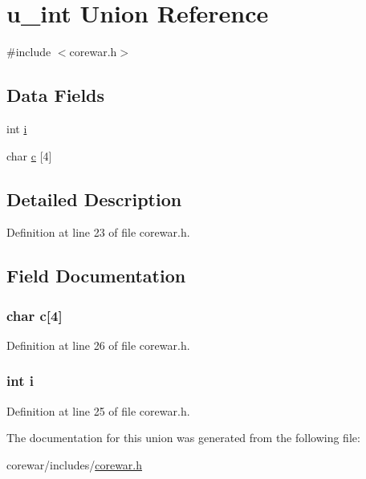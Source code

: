 \hypertarget{unionu__int}{\section{u\-\_\-int Union Reference}
\label{unionu__int}
}


{\ttfamily \#include $<$corewar.\-h$>$}

\subsection*{Data Fields}
\begin{DoxyCompactItemize}
\item 
int \hyperlink{unionu__int_acb559820d9ca11295b4500f179ef6392}{i}
\item 
char \hyperlink{unionu__int_a4430fee26e106ac5b7a95a966e1de8fb}{c} \mbox{[}4\mbox{]}
\end{DoxyCompactItemize}


\subsection{Detailed Description}


Definition at line 23 of file corewar.\-h.



\subsection{Field Documentation}
\hypertarget{unionu__int_a4430fee26e106ac5b7a95a966e1de8fb}{
\subsubsection[{c}]{\setlength{\rightskip}{0pt plus 5cm}char c\mbox{[}4\mbox{]}}}\label{unionu__int_a4430fee26e106ac5b7a95a966e1de8fb}


Definition at line 26 of file corewar.\-h.

\hypertarget{unionu__int_acb559820d9ca11295b4500f179ef6392}{
\subsubsection[{i}]{\setlength{\rightskip}{0pt plus 5cm}int i}}\label{unionu__int_acb559820d9ca11295b4500f179ef6392}


Definition at line 25 of file corewar.\-h.



The documentation for this union was generated from the following file\-:\begin{DoxyCompactItemize}
\item 
corewar/includes/\hyperlink{corewar_8h}{corewar.\-h}\end{DoxyCompactItemize}
